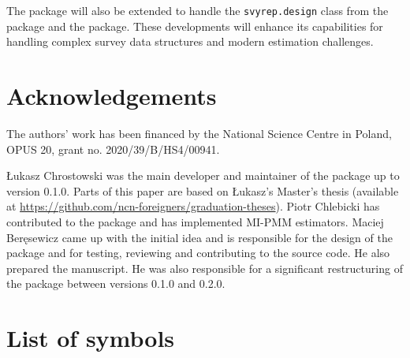 \documentclass[
]{jss}
\begin{document}
The package will also be extended to handle the \texttt{svyrep.design}
class from the  package and the  package. These
developments will enhance its capabilities for handling complex survey
data structures and modern estimation challenges.

\section{Acknowledgements}\label{sec-acknowledgements}

The authors' work has been financed by the National Science Centre in
Poland, OPUS 20, grant no. 2020/39/B/HS4/00941.

Łukasz Chrostowski was the main developer and maintainer of the package
up to version 0.1.0. Parts of this paper are based on Łukasz's Master's
thesis (available at
\url{https://github.com/ncn-foreigners/graduation-theses}). Piotr
Chlebicki has contributed to the package and has implemented MI-PMM
estimators. Maciej Beręsewicz came up with the initial idea and is
responsible for the design of the package and for testing, reviewing and
contributing to the source code. He also prepared the manuscript. He was
also responsible for a significant restructuring of the package between
versions 0.1.0 and 0.2.0.

\clearpage

\appendix

\section{List of symbols}\label{list-of-symbols}
\end{document}
